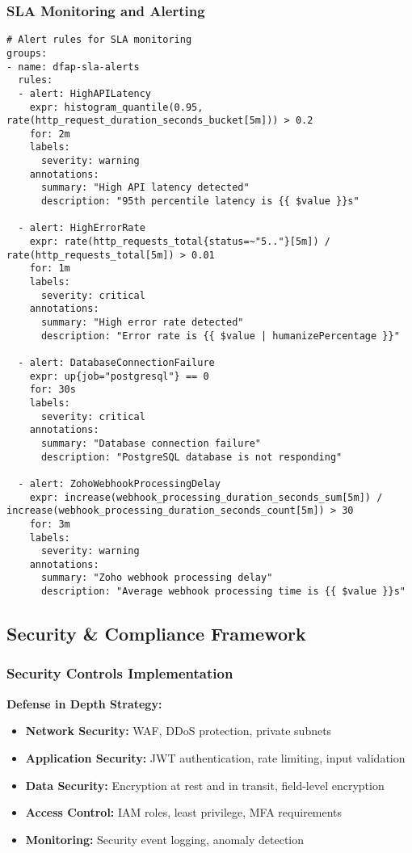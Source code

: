 \subsubsection{SLA Monitoring and Alerting}

\begin{verbatim}
# Alert rules for SLA monitoring
groups:
- name: dfap-sla-alerts
  rules:
  - alert: HighAPILatency
    expr: histogram_quantile(0.95, rate(http_request_duration_seconds_bucket[5m])) > 0.2
    for: 2m
    labels:
      severity: warning
    annotations:
      summary: "High API latency detected"
      description: "95th percentile latency is {{ $value }}s"

  - alert: HighErrorRate
    expr: rate(http_requests_total{status=~"5.."}[5m]) / rate(http_requests_total[5m]) > 0.01
    for: 1m
    labels:
      severity: critical
    annotations:
      summary: "High error rate detected"
      description: "Error rate is {{ $value | humanizePercentage }}"

  - alert: DatabaseConnectionFailure
    expr: up{job="postgresql"} == 0
    for: 30s
    labels:
      severity: critical
    annotations:
      summary: "Database connection failure"
      description: "PostgreSQL database is not responding"

  - alert: ZohoWebhookProcessingDelay
    expr: increase(webhook_processing_duration_seconds_sum[5m]) / increase(webhook_processing_duration_seconds_count[5m]) > 30
    for: 3m
    labels:
      severity: warning
    annotations:
      summary: "Zoho webhook processing delay"
      description: "Average webhook processing time is {{ $value }}s"
\end{verbatim}

\subsection{Security \& Compliance Framework}

\subsubsection{Security Controls Implementation}

\textbf{Defense in Depth Strategy:}
\begin{itemize}
  \item \textbf{Network Security:} WAF, DDoS protection, private subnets
  \item \textbf{Application Security:} JWT authentication, rate limiting, input validation
  \item \textbf{Data Security:} Encryption at rest and in transit, field-level encryption
  \item \textbf{Access Control:} IAM roles, least privilege, MFA requirements
  \item \textbf{Monitoring:} Security event logging, anomaly detection
\end{itemize}

